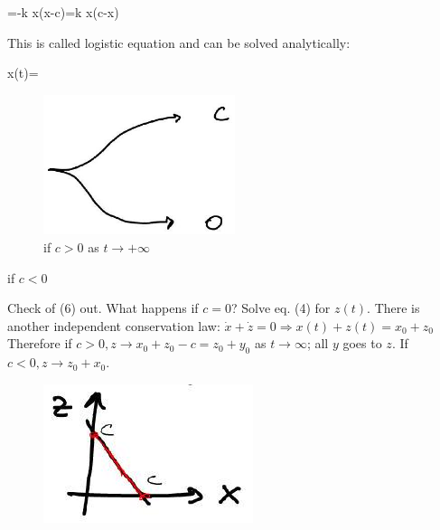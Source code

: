 \begin{DispWithArrows}[displaystyle, format=c]
=-k x(x-c)=k x(c-x)
\end{DispWithArrows}
This is called logistic equation and can be solved analytically:
\begin{DispWithArrows}[displaystyle, format=c]
x(t)=
\end{DispWithArrows}
\begin{figure}[H]
    \centering
    \includegraphics[width=0.5\textwidth]{graphics/2025_10_17_109d3ce1ba98c27731a1g-3(1)}
    \caption{if $c>0$ as $t \rightarrow+\infty$}
\end{figure}
if $c<0$

Check of (6) out. What happens if $c=0$? Solve eq. (4) for $z(t)$. There is
another independent conservation law: $\dot{x}+\dot{z}=0 \Rightarrow x(t)+z(t)=x_{0}+z_{0}$
Therefore if $c>0, z \longrightarrow x_{0}+z_{0}-c=z_{0}+y_{0}$ as $t \rightarrow \infty$;
all $y$ goes to $z$. If $c<0, z \rightarrow z_{0}+x_{0}$.

\begin{figure}[H]
    \centering
    \includegraphics[width=\textwidth]{graphics/2025_10_17_109d3ce1ba98c27731a1g-3(2)}
\end{figure}

